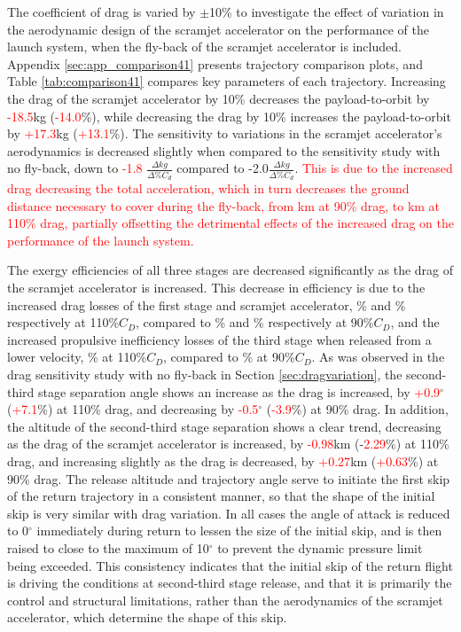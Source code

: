 The coefficient of drag is varied by $\pm$10\% to investigate the effect of variation in the aerodynamic design of the scramjet accelerator on the performance of the launch system, when the fly-back of the scramjet accelerator is included. Appendix \ref{sec:app_comparison41} presents trajectory comparison plots, and Table \ref{tab:comparison41} compares key parameters of each trajectory. 
Increasing the drag of the scramjet accelerator by 10\% decreases the payload-to-orbit by \textcolor{red}{-18.5}kg (\textcolor{red}{-14.0}\%), while decreasing the drag by 10\% increases the payload-to-orbit by \textcolor{red}{+17.3}kg (\textcolor{red}{+13.1}\%). 
The sensitivity to variations in the scramjet accelerator's aerodynamics is decreased slightly when compared to the sensitivity study with no fly-back, down to \textcolor{red}{-1.8} $\frac{\Delta kg}{\Delta\% C_{d}}$ compared to -2.0$\frac{\Delta kg}{\Delta\% C_{d}}$.
\textcolor{red}{This is due to the increased drag decreasing the total acceleration, which in turn decreases the ground distance necessary to cover during the fly-back, from \returnDistCdNinety km at 90\% drag, to \returnDistCdOneHundredTen km at 110\% drag, partially offsetting the detrimental effects of the increased drag on the performance of the launch system. }

The exergy efficiencies of all three stages are decreased significantly as the drag of the scramjet accelerator is increased. This decrease in efficiency is due to the increased drag losses of the first stage and scramjet accelerator, \WDoneCdOneHundredTen\% and \WDsecondCdOneHundredTen\% respectively at 110\%$C_D$, compared to \WDoneCdNinety\% and \WDsecondCdNinety\% respectively at 90\%$C_D$, and the increased propulsive inefficiency losses of the third stage when released from a lower velocity, \PlossthreeCdOneHundredTen\% at 110\%$C_D$, compared to \PlossthreeCdNinety \% at 90\%$C_D$.
As was observed in the drag sensitivity study with no fly-back in Section \ref{sec:dragvariation}, the second-third stage separation angle shows an increase as the drag is increased, by \textcolor{red}{+0.9}$^\circ$ (\textcolor{red}{+7.1}\%) at 110\% drag, and decreasing by \textcolor{red}{-0.5}$^\circ$ (\textcolor{red}{-3.9}\%) at 90\% drag. In addition, the altitude of the second-third stage separation shows a clear trend, decreasing as the drag of the scramjet accelerator is increased, by \textcolor{red}{-0.98}km (-\textcolor{red}{2.29}\%) at 110\% drag, and increasing slightly as the drag is decreased, by \textcolor{red}{+0.27}km (\textcolor{red}{+0.63}\%) at 90\% drag.  
The release altitude and trajectory angle serve to initiate the first skip of the return trajectory in a consistent manner, so that the shape of the initial skip is very similar with drag variation. In all cases the angle of attack is reduced to 0$^\circ$ immediately during return to lessen the size of the initial skip, and is then raised to close to the maximum of 10$^\circ$ to prevent the dynamic pressure limit being exceeded. This consistency indicates that the initial skip of the return flight is driving the conditions at second-third stage release, and that it is primarily the control and structural limitations, rather than the aerodynamics of the scramjet accelerator, which determine the shape of this skip.


